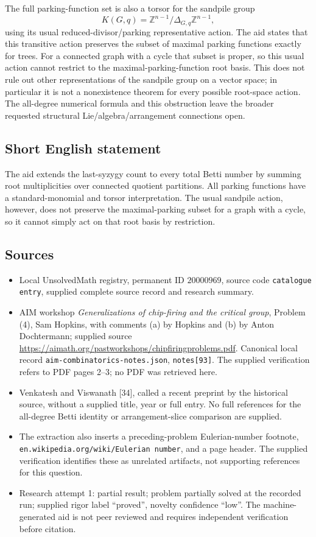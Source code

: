 \documentclass[11pt]{article}
\newcommand{\Z}{\mathbb{Z}}
\begin{document}
The full parking-function set is also a torsor for the sandpile group
\[
 K(G,q)=\Z^{n-1}/\Delta_{G,q}\Z^{n-1},
\]
using its usual reduced-divisor/parking representative action. The aid states that this transitive action preserves the subset of maximal parking functions exactly for trees. For a connected graph with a cycle that subset is proper, so this usual action cannot restrict to the maximal-parking-function root basis. This does not rule out other representations of the sandpile group on a vector space; in particular it is not a nonexistence theorem for every possible root-space action. The all-degree numerical formula and this obstruction leave the broader requested structural Lie/algebra/arrangement connections open.
\subsection{Short English statement}
The aid extends the last-syzygy count to every total Betti number by summing root multiplicities over connected quotient partitions. All parking functions have a standard-monomial and torsor interpretation. The usual sandpile action, however, does not preserve the maximal-parking subset for a graph with a cycle, so it cannot simply act on that root basis by restriction.
\subsection{Sources}
\begin{itemize}
\item Local UnsolvedMath registry, permanent ID $20000969$, source code \texttt{catalogue entry}, supplied complete source record and research summary.
\item AIM workshop \emph{Generalizations of chip-firing and the critical group}, Problem (4), Sam Hopkins, with comments (a) by Hopkins and (b) by Anton Dochtermann; supplied source \url{https://aimath.org/pastworkshops/chipfiringproblems.pdf}. Canonical local record \texttt{aim-combinatorics-notes.json}, \texttt{notes[93]}. The supplied verification refers to PDF pages 2--3; no PDF was retrieved here.
\item Venkatesh and Viswanath [34], called a recent preprint by the historical source, without a supplied title, year or full entry. No full references for the all-degree Betti identity or arrangement-slice comparison are supplied.
\item The extraction also inserts a preceding-problem Eulerian-number footnote, \texttt{en.wikipedia.org/wiki/Eulerian number}, and a page header. The supplied verification identifies these as unrelated artifacts, not supporting references for this question.
\item Research attempt 1: partial result; problem partially solved at the recorded run; supplied rigor label ``proved'', novelty confidence ``low''. The machine-generated aid is not peer reviewed and requires independent verification before citation.
\end{itemize}
\end{document}
